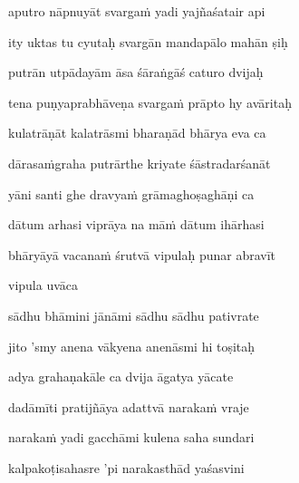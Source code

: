aputro nāpnuyāt svargaṁ yadi yajñaśatair api \veg\dontdisplaylinenum
{}

ity uktas tu cyutaḥ svargān mandapālo mahān ṣiḥ\thinspace{\dandab} \dontdisplaylinenum

putrān utpādayām āsa śāraṅgāś caturo dvijaḥ \veg\dontdisplaylinenum
{}

tena puṇyaprabhāveṇa svargaṁ prāpto hy avāritaḥ\thinspace{\dandab} \dontdisplaylinenum

kulatrāṇāt kalatrāsmi bharaṇād bhārya eva ca \veg\dontdisplaylinenum
{}

dārasaṁgraha putrārthe kriyate śāstradarśanāt\thinspace{\dandab} \dontdisplaylinenum

yāni santi ghe dravyaṁ grāmaghoṣaghāṇi ca \veg\dontdisplaylinenum
{}

dātum arhasi viprāya na māṁ dātum ihārhasi\thinspace{\dandab} \dontdisplaylinenum

bhāryāyā vacanaṁ śrutvā vipulaḥ punar abravīt \veg\dontdisplaylinenum

vipula uvāca~{\dandab}\dontdisplaylinenum 
{}

sādhu bhāmini jānāmi sādhu sādhu pativrate\thinspace{\danda} \dontdisplaylinenum

jito 'smy anena vākyena anenāsmi hi toṣitaḥ \veg\dontdisplaylinenum
{}

adya grahaṇakāle ca dvija āgatya yācate\thinspace{\dandab} \dontdisplaylinenum

dadāmīti pratijñāya adattvā narakaṁ vraje \veg\dontdisplaylinenum
{}

narakaṁ yadi gacchāmi kulena saha sundari\thinspace{\dandab} \dontdisplaylinenum

kalpakoṭisahasre 'pi narakasthād yaśasvini \veg\dontdisplaylinenum
{}

